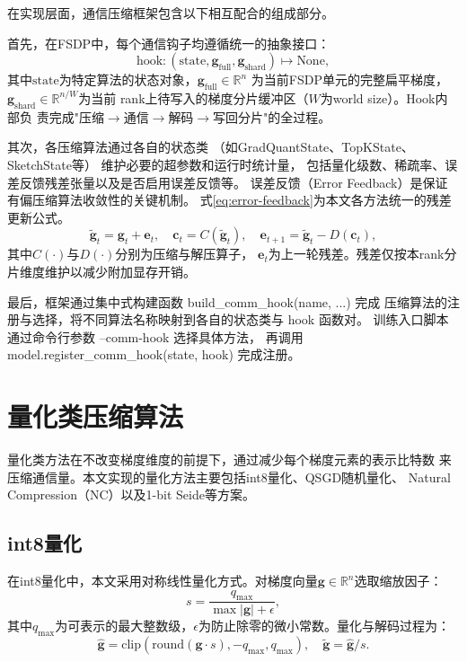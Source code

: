 在实现层面，通信压缩框架包含以下相互配合的组成部分。

首先，在FSDP中，每个通信钩子均遵循统一的抽象接口：
\begin{equation}
\text{hook}: (\text{state}, \mathbf{g}_{\text{full}}, \mathbf{g}_{\text{shard}}) \mapsto \text{None},
\label{eq:hook-interface}
\end{equation}
其中$\text{state}$为特定算法的状态对象，$\mathbf{g}_{\text{full}} \in \mathbb{R}^{n}$
为当前FSDP单元的完整扁平梯度，$\mathbf{g}_{\text{shard}} \in \mathbb{R}^{n/W}$为当前
rank上待写入的梯度分片缓冲区（$W$为world size）。Hook内部负
责完成"压缩$\to$通信$\to$解码$\to$写回分片"的全过程。

其次，各压缩算法通过各自的状态类
（如GradQuantState、TopKState、SketchState等）
维护必要的超参数和运行时统计量，
包括量化级数、稀疏率、误差反馈残差张量以及是否启用误差反馈等。
误差反馈（Error Feedback）是保证有偏压缩算法收敛性的关键机制。
式\ref{eq:error-feedback}为本文各方法统一的残差更新公式。
\begin{equation}
\tilde{\mathbf{g}}_t = \mathbf{g}_t + \mathbf{e}_t, \quad \mathbf{c}_t = C(\tilde{\mathbf{g}}_t), \quad \mathbf{e}_{t+1} = \tilde{\mathbf{g}}_t - D(\mathbf{c}_t),
\label{eq:error-feedback}
\end{equation}
其中$C(\cdot)$与$D(\cdot)$分别为压缩与解压算子，
$\mathbf{e}_t$为上一轮残差。残差仅按本rank分片维度维护以减少附加显存开销。

最后，框架通过集中式构建函数 build\_comm\_hook(name, ...) 完成
压缩算法的注册与选择，将不同算法名称映射到各自的状态类与 hook 函数对。
训练入口脚本通过命令行参数 --comm-hook 选择具体方法，
再调用 model.register\_comm\_hook(state, hook) 完成注册。

\section{量化类压缩算法}

量化类方法在不改变梯度维度的前提下，通过减少每个梯度元素的表示比特数
来压缩通信量。本文实现的量化方法主要包括int8量化、QSGD随机量化、
Natural Compression（NC）以及1-bit Seide等方案。

\subsection{int8量化}

在int8量化中，本文采用对称线性量化方式。对梯度向量$\mathbf{g} \in \mathbb{R}^{n}$选取缩放因子：
\begin{equation}
s = \frac{q_{\max}}{\max|\mathbf{g}| + \epsilon},
\label{eq:int8-scale}
\end{equation}
其中$q_{\max}$为可表示的最大整数级，$\epsilon$为防止除零的微小常数。量化与解码过程为：
\begin{equation}
\hat{\mathbf{g}} = \text{clip}(\text{round}(\mathbf{g} \cdot s), -q_{\max}, q_{\max}), \quad \tilde{\mathbf{g}} = \hat{\mathbf{g}} / s.
\label{eq:int8-quantdequant}
\end{equation}

